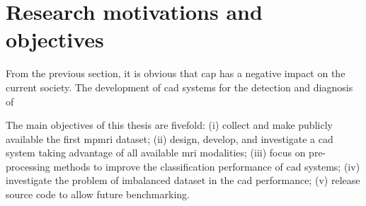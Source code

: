 \section{Research motivations and objectives}\label{sec:intro:motivation}


From the previous section, it is obvious that \ac{cap} has a negative impact on the current society.
The development of \ac{cad} systems for the detection and diagnosis of 

The main objectives of this thesis are fivefold: (i) collect and make publicly available the first \ac{mpmri} dataset; (ii) design, develop, and investigate a \ac{cad} system taking advantage of all available \ac{mri} modalities; (iii) focus on pre-processing methods to improve the classification performance of \ac{cad} systems; (iv) investigate the problem of imbalanced dataset in the \ac{cad} performance; (v) release source code to allow future benchmarking.
